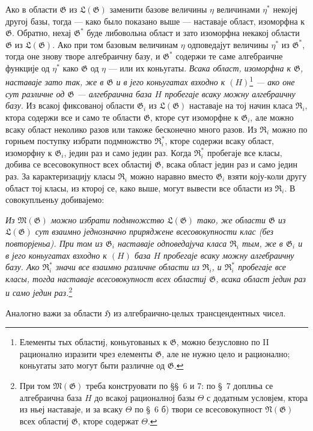 ﻿\documentclass[11pt]{article}
\begin{document}
Ако в области $\mathfrak G$ из $\mathfrak L(\mathfrak G)$ заменити базове
величины $\eta$ величинами $\eta^*$ некојеј другој базы, тогда --- како было
показано выше --- наставаје област, изоморфна к $\mathfrak G$. Обратно, нехај
$\mathfrak G^*$ буде либовольна област и зато изоморфна некакој области
$\mathfrak G$ из $\mathfrak L(\mathfrak G)$. Ако при том базовым величинам
$\eta$ одповедајут величины $\eta^*$ из $\mathfrak G^*$, тогда оне знову
творе алгебраичну базу, и $\mathfrak G^*$ содержи те саме алгебраичне функције
од $\eta^*$ како $\mathfrak G$ од $\eta$ --- или их коньугаты. {\itshape Всака
област, изоморфна к $\mathfrak G$, наставаје зато так, же в $\mathfrak G$ и в
јего коньугатах взходно к $(H)$}\footnote{Елементы тых областиј, коньугованых
к $\mathfrak G$, можно безусловно по II рационално изразити чрез елементы
$\mathfrak G$, але не нужно цело и рационално; коньугаты зато могут быти
различне од $\mathfrak G$.} {\itshape --- ако оне сут различне од
$\mathfrak G$ --- алгебраична база $H$ пробегаје всаку можну алгебраичну базу.}
Из всакој фиксованој области $\mathfrak G_i$ из $\mathfrak L(\mathfrak G)$
наставаје на тој начин класа $\mathfrak R_i$, ктора содержи все и само те
области $\mathfrak G$, кторе сут изоморфне к $\mathfrak G_i$, але можно всаку
област неколико разов или такоже бесконечно много разов. Из
$\mathfrak R_i$ можно по горньем поступку избрати подмножство
$\mathfrak R_i^*$, кторе содержи всаку област, изоморфну к
$\mathfrak G_i$, једин раз и само једин раз. Когда $\mathfrak R_i^*$ пробегаје
все класы, добива се всесовокупност всех областиј $\mathfrak G$, всака област
једин раз и само једин раз. За карактеризацију класы $\mathfrak R_i$ можно
наравно вместо $\mathfrak G_i$ взяти коју-коли другу област тој класы, из кторој
се, како выше, могут вывести все области из $\mathfrak R_i$. В совокупльеньу
добивајемо:

{\itshape Из $\mathfrak M(\mathfrak G)$ можно избрати подмножство
$\mathfrak L(\mathfrak G)$ тако, же области $\mathfrak G$ из
$\mathfrak L(\mathfrak G)$ сут взаимно једнозначно приряджене всесовокупности
клас (без повторјеньа). При том из $\mathfrak G_i$ наставаје одповедајуча класа
$\mathfrak R_i$ тым, же в $\mathfrak G_i$ и в јего коньугатах взходно к
$(H)$ база $H$ пробегаје всаку можну алгебраичну базу. Ако
$\mathfrak R_i^*$ значи все взаимно различне области из $\mathfrak R_i$, и
$\mathfrak R_i^*$ пробегаје все класы, тогда наставаје всесовокупност всех
областиј $\mathfrak G$, всака област једин раз и само једин раз.}\footnote{При
том $\mathfrak M(\mathfrak G)$ треба конструовати по \S\S\ 6 и 7: по \S\ 7
доплньа се алгебраична база $H$ до всакој рационалној базы $\Theta$ с додатным
условјем, ктора из ньеј наставаје, и за всаку $\Theta$ по \S\ 6 б) твори се
всесовокупност $\mathfrak N(\mathfrak G)$ всех областиј $\mathfrak G$, кторе
содержат $\Theta$.}

Аналогно важи за области $\mathfrak H$ из алгебраично-целых трансцендентных
чисел.
\end{document}
